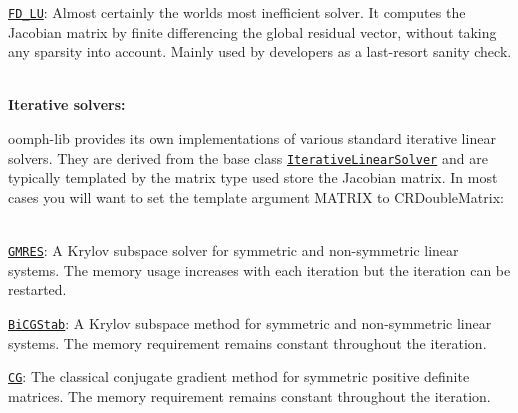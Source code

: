\begin{DoxyItemize}
\begin{DoxyItemize}
\begin{DoxyItemize}
\item \href{../../the_data_structure/html/classoomph_1_1FD__LU.html}{\tt {\ttfamily F\+D\+\_\+\+LU}}\+: Almost certainly the world\textquotesingle{}s most inefficient solver. It computes the Jacobian matrix by finite differencing the global residual vector, without taking any sparsity into account. Mainly used by developers as a last-\/resort sanity check. ~\newline
~\newline

\end{DoxyItemize}
\item {\bfseries Iterative solvers\+:} ~\newline
~\newline

\begin{DoxyItemize}
\item {\ttfamily oomph-\/lib} provides its own implementations of various standard iterative linear solvers. They are derived from the base class \href{../../the_data_structure/html/classoomph_1_1IterativeLinearSolver.html}{\tt {\ttfamily Iterative\+Linear\+Solver}} and are typically templated by the matrix type used store the Jacobian matrix. In most cases you will want to set the template argument {\ttfamily M\+A\+T\+R\+IX} to {\ttfamily C\+R\+Double\+Matrix\+:} ~\newline
~\newline

\begin{DoxyItemize}
\item \href{../../the_data_structure/html/classoomph_1_1GMRES.html}{\tt {\ttfamily G\+M\+R\+ES}}\+: A Krylov subspace solver for symmetric and non-\/symmetric linear systems. The memory usage increases with each iteration but the iteration can be restarted. ~\newline
~\newline

\item \href{../../the_data_structure/html/classoomph_1_1BiCGStab.html}{\tt {\ttfamily Bi\+C\+G\+Stab}}\+: A Krylov subspace method for symmetric and non-\/symmetric linear systems. The memory requirement remains constant throughout the iteration.~\newline
~\newline

\item \href{../../the_data_structure/html/classoomph_1_1CG.html}{\tt {\ttfamily CG}}\+: The classical conjugate gradient method for symmetric positive definite matrices. The memory requirement remains constant throughout the iteration. ~\newline


\end{DoxyItemize}
\end{DoxyItemize}
\end{DoxyItemize}
\end{DoxyItemize}
